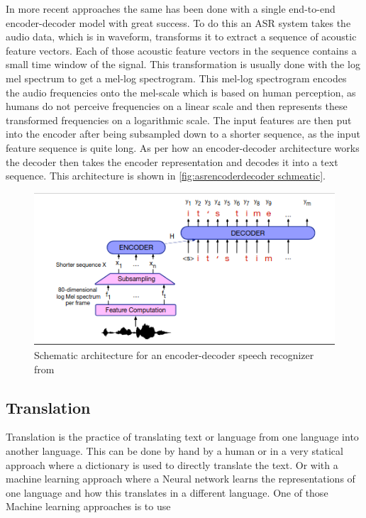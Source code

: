 In more recent approaches the same has been done with a single end-to-end encoder-decoder model with great success. 
To do this an ASR system takes the audio data, which is in waveform, transforms it to extract a sequence of acoustic feature vectors. 
Each of those acoustic feature vectors in the sequence contains a small time window of the signal. 
This transformation is usually done with the log mel spectrum to get a mel-log spectrogram. \cite[chapter~16]{jm3}
This mel-log spectrogram encodes the audio frequencies onto the mel-scale which is based on human perception, as humans do not perceive frequencies on a linear scale \cite{mellogscale} and then represents these transformed frequencies on a logarithmic scale. 
The input features are then put into the encoder after being subsampled down to a shorter sequence, as the input feature sequence is quite long. 
As per how an encoder-decoder architecture works the decoder then takes the encoder representation and decodes it into a text sequence. 
This architecture is shown in \autoref{fig:asrencoderdecoder schmeatic}.
\begin{figure}[h]
    \centering
    \includegraphics[width=\linewidth]{Latex//sections//images/asrencoderdecoder.png}
    \caption{Schematic architecture for an encoder-decoder speech recognizer from \cite{jm3}}
    \label{fig:asrencoderdecoder schmeatic}
\end{figure}


\subsection{Translation}
Translation is the practice of translating text or language from one language into another language. 
This can be done by hand by a human or in a very statical approach where a dictionary is used to directly translate the text. 
Or with a machine learning approach where a Neural network learns the representations of one language and how this translates in a different language. 
One of those Machine learning approaches is to use 

